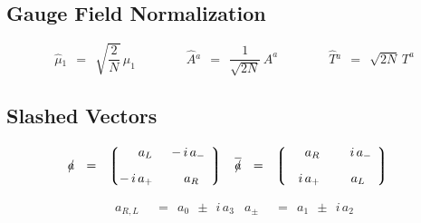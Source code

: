 \documentclass[14pt]{article}
\newcommand{\lgr}{\left\lgroup}
\newcommand{\rgr}{\right\rgroup}
\def\slashed#1{\setbox0=\hbox{$#1$}             %
   \dimen0=\wd0                                 %
   \setbox1=\hbox{/} \dimen1=\wd1               %
   \ifdim\dimen0>\dimen1                        %
      \rlap{\hbox to \dimen0{\hfil/\hfil}}      %
      #1                                        %
   \else                                        %
      \rlap{\hbox to \dimen1{\hfil$#1$\hfil}}   %
      /                                         %
   \fi}                                         %
\begin{document}
\vspace{2mm}
\subsection*{\centering Gauge Field Normalization}

\begin{equation*}
	\hat{\mu}{}_1    ~~=~~    \sqrt{\frac{2}{N}}\, \mu_1
	\qquad\qquad
	\hat{A}{}^a    ~~=~~    \frac{1}{\sqrt{2 N}}\, A^a
	\qquad\qquad
	\hat{T}{}^a    ~~=~~    \sqrt{2N}\, T^a
\end{equation*}


\vspace{2mm}
\subsection*{\centering Slashed Vectors}

\begin{align*}
%
	\slashed{a}    & ~~=~~
				\lgr
					\begin{matrix}
						\phantom{-\, i\,}a_L	&	-\, i\, a_-	\\[3mm]
						-\, i\, a_+		&	\phantom{-\, i\,}a_R\phantom{+\,}
					\end{matrix}
				\rgr
	&
	\overline{\slashed{a}}    & ~~=~~
				\lgr
					\begin{matrix}
						\phantom{+\, i\,}a_R	&	\phantom{+\,}i\, a_-	\\[3mm]
						\phantom{+\,}i\, a_+	&	\phantom{+\, i\,}a_L\phantom{+\,}
					\end{matrix}
				\rgr
\end{align*}

\begin{align*}
%
	a_{R,L}    & ~~=~~    a_0  ~~\pm~~  i\, a_3	&
	a_\pm      & ~~=~~    a_1  ~~\pm~~  i\, a_2
\end{align*}
\end{document}
